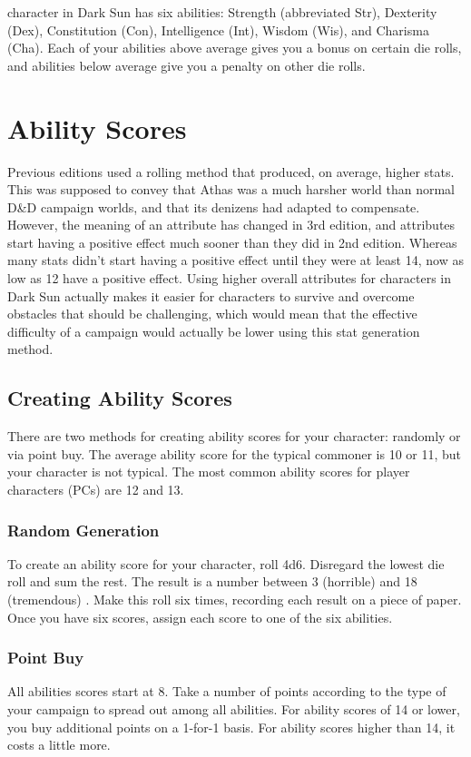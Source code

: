  character in Dark Sun has six abilities: Strength (abbreviated Str), Dexterity (Dex), Constitution (Con), Intelligence (Int), Wisdom (Wis), and Charisma (Cha). Each of your abilities above average gives you a bonus on certain die rolls, and abilities below average give you a penalty on other die rolls.

\section{Ability Scores}

Previous editions used a rolling method that produced, on average, higher stats. This was supposed to convey that Athas was a much harsher world than normal D\&D campaign worlds, and that its denizens had adapted to compensate. However, the meaning of an attribute has changed in 3rd edition, and attributes start having a positive effect much sooner than they did in 2nd edition. Whereas many stats didn't start having a positive effect until they were at least 14, now as low as 12 have a positive effect. Using higher overall attributes for characters in Dark Sun actually makes it easier for characters to survive and overcome obstacles that should be challenging, which would mean that the effective difficulty of a campaign would actually be lower using this stat generation method.

\subsection{Creating Ability Scores}
There are two methods for creating ability scores for your character: randomly or via point buy.  The average ability score for the typical commoner is 10 or 11, but your character is not typical. The most common ability scores for player characters (PCs) are 12 and 13.

\subsubsection{Random Generation}
To create an ability score for your character, roll 4d6. Disregard the lowest die roll and sum the rest. The result is a number between 3 (horrible) and 18 (tremendous)
.
Make this roll six times, recording each result on a piece of paper. Once you have six scores, assign each score to one of the six abilities.

\subsubsection{Point Buy}
All abilities scores start at 8. Take a number of points according to the type of your campaign to spread out among all abilities. For ability scores of 14 or lower, you buy additional points on a 1-for-1 basis. For ability scores higher than 14, it costs a little more.

